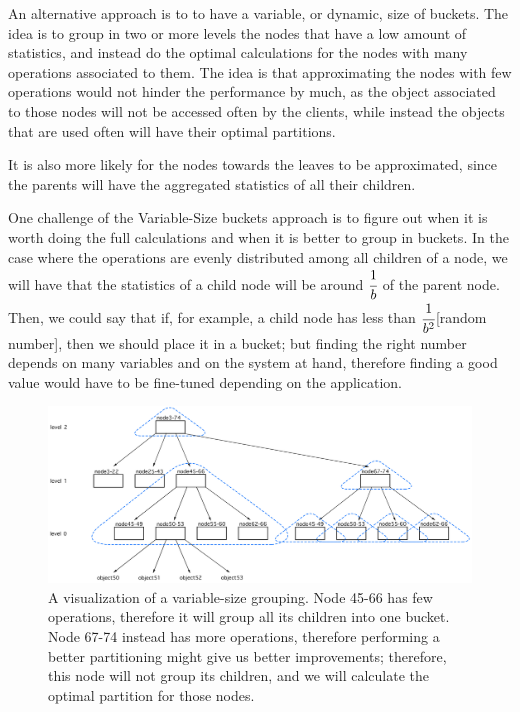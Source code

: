 An alternative approach is to to have a variable, or dynamic, size of buckets. The idea is to group in two or more levels the nodes that have a low amount of statistics, and instead do the optimal calculations for the nodes with many operations associated to them. The idea is that approximating the nodes with few operations would not hinder the performance by much, as the object associated to those nodes will not be accessed often by the clients, while instead the objects that are used often will have their optimal partitions.

It is also more likely for the nodes towards the leaves to be approximated, since the parents will have the aggregated statistics of all their children.

One challenge of the Variable-Size buckets approach is to figure out when it is worth doing the full calculations and when it is better to group in buckets. In the case where the operations are evenly distributed among all children of a node, we will have that the statistics of a child node will be around $\cfrac{1}{b}$ of the parent node. Then, we could say that if, for example, a child node has less than $\cfrac{1}{b^2}$[random number], then we should place it in a bucket; but finding the right number depends on many variables and on the system at hand, therefore finding a good value would have to be fine-tuned depending on the application.

\begin{figure}[!htb]
  \centering
  \includegraphics[width=\textwidth,height=\textheight,keepaspectratio]{img/dynamic-buckets.png}
  \caption[caption]{ A visualization of a variable-size grouping. Node 45-66 has few operations, therefore it will group all its children into one bucket. Node 67-74 instead has more operations, therefore performing a better partitioning might give us better improvements; therefore, this node will not group its children, and we will calculate the optimal partition for those nodes. }
  \label{fig:Variable-Size-buckets}
\end{figure}

